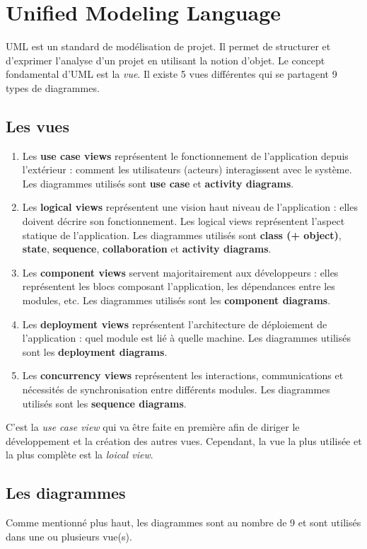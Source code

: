 \documentclass{article}
\begin{document}
\section{Unified Modeling Language}
	UML est un standard de modélisation de projet. Il permet de structurer et d'exprimer l'analyse d'un projet en utilisant la notion d'objet. Le concept fondamental d'UML est la \textit{vue}.
	Il existe 5 vues différentes qui se partagent 9 types de diagrammes.

	\subsection{Les vues}
		\begin{enumerate}
			\item Les \textbf{use case views} représentent le fonctionnement de l'application depuis l'extérieur : comment les utilisateurs (acteurs) interagissent avec le système.
				Les diagrammes utilisés sont \textbf{use case} et \textbf{activity diagrams}.
			\item Les \textbf{logical views} représentent une vision haut niveau de l'application : elles doivent décrire son fonctionnement. Les logical views représentent l'aspect
				statique de l'application. Les diagrammes utilisés sont \textbf{class (+ object)}, \textbf{state}, \textbf{sequence}, \textbf{collaboration} et \textbf{activity diagrams}.
			\item Les \textbf{component views} servent majoritairement aux développeurs : elles représentent les blocs composant l'application, les dépendances entre les modules, etc.
				Les diagrammes utilisés sont les \textbf{component diagrams}.
			\item Les \textbf{deployment views} représentent l'architecture de déploiement de l'application : quel module est lié à quelle machine.
				Les diagrammes utilisés sont les \textbf{deployment diagrams}.
			\item Les \textbf{concurrency views} représentent les interactions, communications et nécessités de synchronisation entre différents modules.
				Les diagrammes utilisés sont les \textbf{sequence diagrams}.
		\end{enumerate}

		C'est la \textit{use case view} qui va être faite en première afin de diriger le développement et la création des autres vues. Cependant, la vue la plus utilisée et la plus complète
		est la \textit{loical view}.
	
	\subsection{Les diagrammes}
		Comme mentionné plus haut, les diagrammes sont au nombre de 9 et sont utilisés dans une ou plusieurs vue(s).
\end{document}
